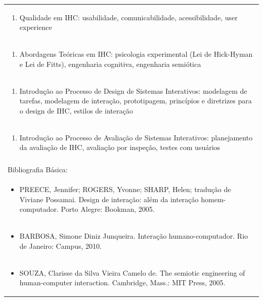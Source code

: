 \documentclass[11pt]{article}
\begin{document}
\begin{center}
\begin{longtable}{|p{4cm}|p{4cm}|p{4cm}|p{4cm}|}
\multicolumn{4}{|p{\dimexpr 16cm + 6\tabcolsep\relax}|}{\begin{enumerate}[start=2]\item Qualidade em IHC: usabilidade, comunicabilidade, acessibilidade, user experience\end{enumerate}}\\
\multicolumn{4}{|p{\dimexpr 16cm + 6\tabcolsep\relax}|}{\begin{enumerate}[start=3]\item Abordagens Teóricas em IHC: psicologia experimental (Lei de Hick-Hyman e Lei de Fitts), engenharia cognitiva, engenharia semiótica\end{enumerate}}\\
\multicolumn{4}{|p{\dimexpr 16cm + 6\tabcolsep\relax}|}{\begin{enumerate}[start=4]\item Introdução ao Processo de Design de Sistemas Interativos: modelagem de tarefas, modelagem de interação, prototipagem, princípios e diretrizes para o design de IHC, estilos de interação\end{enumerate}}\\
\multicolumn{4}{|p{\dimexpr 16cm + 6\tabcolsep\relax}|}{\begin{enumerate}[start=5]\item Introdução ao Processo de Avaliação de Sistemas Interativos: planejamento da avaliação de IHC, avaliação por inspeção, testes com usuários\end{enumerate}}\\
\multicolumn{4}{|p{\dimexpr 16cm + 6\tabcolsep\relax}|}{}\\
\hline
\multicolumn{4}{|p{16cm}|}{Bibliografia Básica:}\\*
\multicolumn{4}{|p{\dimexpr 16cm + 6\tabcolsep\relax}|}{\begin{itemize}\item PREECE, Jennifer; ROGERS, Yvonne; SHARP, Helen; tradução de Viviane Possamai. Design de interação: além da interação homem-computador. Porto Alegre: Bookman, 2005.\end{itemize}}\\
\multicolumn{4}{|p{\dimexpr 16cm + 6\tabcolsep\relax}|}{\begin{itemize}\item BARBOSA, Simone Diniz Junqueira. Interação humano-computador. Rio de Janeiro: Campus, 2010.\end{itemize}}\\
\multicolumn{4}{|p{\dimexpr 16cm + 6\tabcolsep\relax}|}{\begin{itemize}\item SOUZA, Clarisse da Silva Vieira Camelo de. The semiotic engineering of human-computer interaction. Cambridge, Mass.: MIT Press, 2005.\end{itemize}}\\

\end{longtable}
\end{center}
\end{document}
